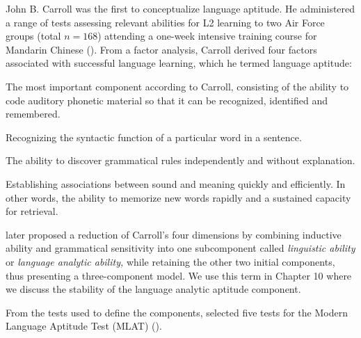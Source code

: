 \documentclass[output=paper]{langscibook}
\begin{document}
John B. Carroll was the first to conceptualize language aptitude. He administered a range of tests assessing relevant abilities for L2 learning to two Air Force groups (total $n=168$) attending a one-week intensive training course for Mandarin Chinese (\citealt{Carroll1958,Carroll1964,Carroll1958}). From a factor analysis, Carroll derived four factors associated with successful language learning, which he termed language aptitude: 

\begin{description}\sloppy
\item[Phonetic coding ability:] The most important component according to Carroll, consisting of the ability to code auditory phonetic material so that it can be recognized, identified and remembered.

\item[Grammatical sensitivity:] Recognizing the syntactic function of a particular word in a sentence.

\item[Inductive learning ability:] The ability to discover grammatical rules independently and without explanation.

\item[Rote learning ability:] Establishing associations between sound and meaning quickly and efficiently. In other words, the ability to memorize new words rapidly and a sustained capacity for retrieval.

\end{description}

\citet{Skehan1998} later proposed a reduction of Carroll’s four dimensions by combining inductive ability and grammatical sensitivity into one subcomponent called \textit{linguistic ability} or \textit{language analytic ability,} while retaining the other two initial components, thus presenting a three-component model. We use this term in Chapter 10 where we discuss the stability of the language analytic aptitude component. 

From the tests used to define the components, \citet{CarrollSapon1959} selected five tests for the Modern Language Aptitude Test (MLAT) ().
\end{document}

